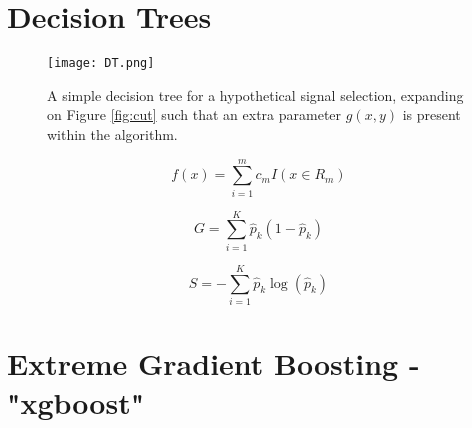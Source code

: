 \section{Decision Trees}

\begin{figure}[htbp]
    \centering
    \texttt{[image: DT.png]}
    \caption{A simple decision tree for a hypothetical signal selection, expanding on Figure \ref{fig:cut} such that an extra parameter $g(x,y)$ is present within the algorithm.}
    \label{fig:tree}
\end{figure}

\begin{equation}
    f(x) = \sum_{i=1}^m c_m I(x\in R_m)
    \label{eq:DT}
\end{equation}

\begin{equation}
    G = \sum_{i=1}^K \hat{p}_k(1-\hat{p}_k)
    \label{eq:Gini}
\end{equation}

\begin{equation}
    S = -\sum_{i=1}^K \hat{p}_k \log(\hat{p}_k)
    \label{eq:Entropy}
\end{equation}

\section{Extreme Gradient Boosting - "xgboost"}


